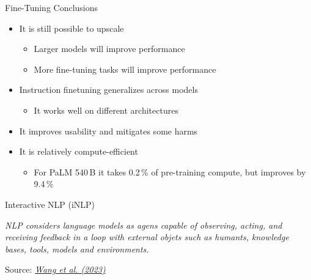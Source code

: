 
\begin{vbframe}{Fine-Tuning Conclusions}

\vfill

\begin{itemize}
\item It is still possible to upscale
    \begin{itemize}
    \item Larger models will improve performance
    \item More fine-tuning tasks will improve performance
    \end{itemize}
\item Instruction finetuning generalizes across models
    \begin{itemize}
    \item It works well on different architectures
    \end{itemize}
\item It improves usability and mitigates some harms
\item It is relatively compute-efficient
    \begin{itemize}
    \item For PaLM 540\,B it takes 0.2\,\% of pre-training compute, but improves by 9.4\,\%
    \end{itemize}
\end{itemize}

\vfill

\end{vbframe}

\endlecture


\begin{vbframe}{Interactive NLP (\MakeLowercase{i}NLP)}

\vfill

\emph{NLP considers language models as agens capable of observing, acting, and receiving feedback in a loop with external objets such as humants, knowledge bases, tools, models and environments.} \vskip2mm

\footnotesize{Source:} \href{https://arxiv.org/pdf/2305.13246.pdf}{\footnotesize \it Wang et al. (2023)}

\vfill

\end{vbframe}

